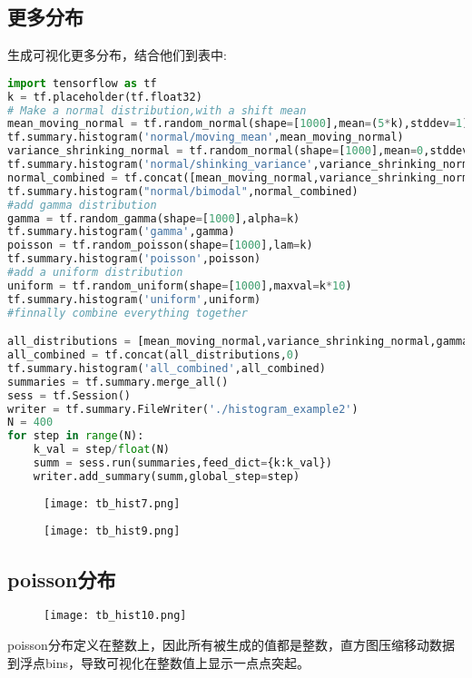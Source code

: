 \subsection{更多分布}
生成可视化更多分布，结合他们到表中:
\begin{lstlisting}[language=Python]
import tensorflow as tf
k = tf.placeholder(tf.float32)
# Make a normal distribution,with a shift mean
mean_moving_normal = tf.random_normal(shape=[1000],mean=(5*k),stddev=1)
tf.summary.histogram('normal/moving_mean',mean_moving_normal)
variance_shrinking_normal = tf.random_normal(shape=[1000],mean=0,stddev=1-(k))
tf.summary.histogram('normal/shinking_variance',variance_shrinking_normal)
normal_combined = tf.concat([mean_moving_normal,variance_shrinking_normal],0)
tf.summary.histogram("normal/bimodal",normal_combined)
#add gamma distribution
gamma = tf.random_gamma(shape=[1000],alpha=k)
tf.summary.histogram('gamma',gamma)
poisson = tf.random_poisson(shape=[1000],lam=k)
tf.summary.histogram('poisson',poisson)
#add a uniform distribution
uniform = tf.random_uniform(shape=[1000],maxval=k*10)
tf.summary.histogram('uniform',uniform)
#finnally combine everything together

all_distributions = [mean_moving_normal,variance_shrinking_normal,gamma,poisson,uniform]
all_combined = tf.concat(all_distributions,0)
tf.summary.histogram('all_combined',all_combined)
summaries = tf.summary.merge_all()
sess = tf.Session()
writer = tf.summary.FileWriter('./histogram_example2')
N = 400
for step in range(N):
    k_val = step/float(N)
    summ = sess.run(summaries,feed_dict={k:k_val})
    writer.add_summary(summ,global_step=step)
\end{lstlisting}
\begin{center}
\begin{figure}[H]
\texttt{[image: tb\_hist7.png]}
\end{figure}
\end{center}
\begin{center}
\begin{figure}
\texttt{[image: tb\_hist9.png]}
\end{figure}
\end{center}
\subsection{poisson分布}
\begin{center}
\begin{figure}[H]
\texttt{[image: tb\_hist10.png]}
\end{figure}
\end{center}
poisson分布定义在整数上，因此所有被生成的值都是整数，直方图压缩移动数据到浮点bins，导致可视化在整数值上显示一点点突起。

